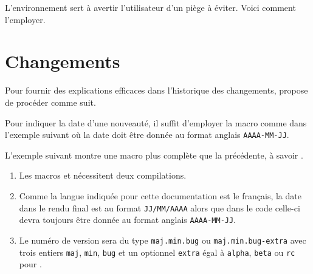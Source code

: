 L'environnement  sert à avertir l'utilisateur d'un piège à éviter. Voici comment l'employer.



\section{Changements}

\begin{bdocexa}
    Pour fournir des explications efficaces dans l'historique des changements,  propose de procéder comme suit.

\end{bdocexa}




\begin{bdocexa}
    Pour indiquer la date d'une nouveauté, il suffit d'employer la macro  comme dans l'exemple suivant où la date doit être donnée au format anglais \texttt{AAAA-MM-JJ}.

\end{bdocexa}




\begin{bdocexa}
    L'exemple suivant montre une macro plus complète que la précédente, à savoir .

\end{bdocexa}


\begin{bdocimportant}
    \leavevmode

    \begin{enumerate}
        \item Les macros  et  nécessitent deux compilations.

        \item Comme la langue indiquée pour cette documentation est le français, la date dans le rendu final est au format \texttt{JJ/MM/AAAA} alors que dans le code celle-ci devra toujours être donnée au format anglais \texttt{AAAA-MM-JJ}.

        \item Le numéro de version sera du type \texttt{maj.min.bug} ou \texttt{maj.min.bug-extra} avec trois entiers \texttt{maj}, \texttt{min}, \texttt{bug} et un optionnel \texttt{extra} égal à \texttt{alpha}, \texttt{beta} ou \texttt{rc} pour .
    \end{enumerate}
\end{bdocimportant}


